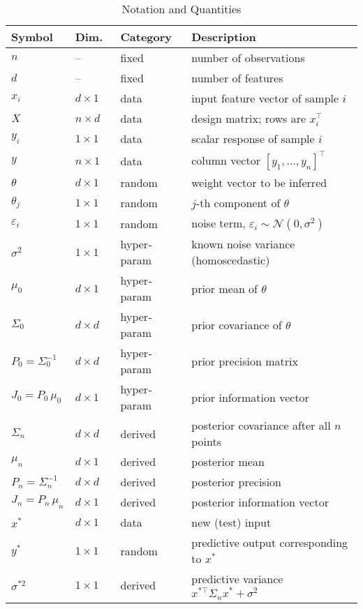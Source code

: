 \documentclass[11pt]{article}
\begin{document}
\begin{table}[ht]
  \centering
  \begin{tabular}{llll}
    \toprule
    Symbol & Dim.\ & Category & Description \\
    \midrule
    $n$                    & –         & fixed       & number of observations \\
    $d$                    & –         & fixed       & number of features \\
    $x_i$                  & $d\times1$ & data        & input feature vector of sample $i$ \\
    $X$                    & $n\times d$ & data       & design matrix; rows are $x_i^\top$ \\
    $y_i$                  & $1\times1$  & data       & scalar response of sample $i$ \\
    $y$                    & $n\times1$  & data       & column vector $[y_1,\dots,y_n]^\top$ \\
    $\theta$               & $d\times1$ & random     & weight vector to be inferred \\
    $\theta_j$             & $1\times1$ & random     & $j$-th component of $\theta$ \\
    $\varepsilon_i$        & $1\times1$ & random     & noise term, $\varepsilon_i\sim\mathcal{N}(0,\sigma^2)$ \\
    $\sigma^2$             & $1\times1$ & hyper‐param & known noise variance (homoscedastic) \\
    $\mu_0$                & $d\times1$ & hyper‐param & prior mean of $\theta$ \\
    $\Sigma_0$             & $d\times d$ & hyper‐param & prior covariance of $\theta$ \\
    $P_0 = \Sigma_0^{-1}$  & $d\times d$ & hyper‐param & prior precision matrix \\
    $J_0 = P_0\,\mu_0$     & $d\times1$ & hyper‐param & prior information vector \\
    $\Sigma_n$             & $d\times d$ & derived     & posterior covariance after all $n$ points \\
    $\mu_n$                & $d\times1$ & derived     & posterior mean \\
    $P_n = \Sigma_n^{-1}$  & $d\times d$ & derived     & posterior precision \\
    $J_n = P_n\,\mu_n$     & $d\times1$ & derived     & posterior information vector \\
    $x^*$                  & $d\times1$ & data        & new (test) input \\
    $y^*$                  & $1\times1$ & random      & predictive output corresponding to $x^*$ \\
    $\sigma^{*2}$          & $1\times1$ & derived     & predictive variance $x^{*\top}\Sigma_n x^* + \sigma^2$ \\
    \bottomrule
  \end{tabular}
  \caption{Notation and Quantities}
  \label{tab:notation}
\end{table}
\end{document}
